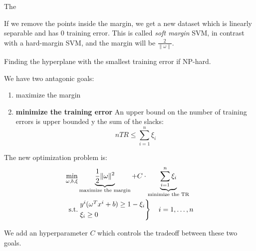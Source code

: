 The\begin{figure}[H]
\end{figure}

If we remove the points inside the margin, we get a new dataset
which is linearly separable and has 0 training error. This is called
\emph{soft margin} SVM, in contrast with a hard-margin SVM, and
the margin will be $\frac{2}{\|\omega\|}$.

Finding the hyperplane with the smallest training error
if NP-hard.

We  have two antagonic goals:
\begin{enumerate}
	\item maximize the margin
	\item \textbf{minimize the training error} An upper bound on the
	      number of training errors is upper bounded y the sum of the slacks:
	      \begin{equation*}
		      n TR \leq \sum_{i=1}^n \xi_i
	      \end{equation*}
\end{enumerate}

The new optimization problem is:
\begin{align*}
	\min_{\omega, b, \xi} &
	\underbrace{\frac{1}{2} \|\omega\|^2}_{\text{maximize the margin}}
	+ C \cdot \underbrace{\sum_{i=1}^n \xi_i}_{\text{minimize the TR}} \\
	\text{s.t.}           & \begin{rcases*}
		                        y^i (\omega^T x^i + b) \geq 1 - \xi_i \\
		                        \xi_i \geq 0
	                        \end{rcases*}
	\quad i=1,\dots,n
\end{align*}

We add an hyperparameter $C$ which controls the tradeoff between
these two goals.

